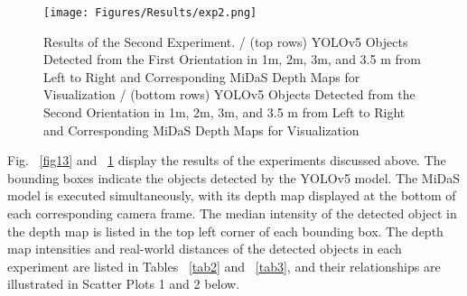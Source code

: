 \begin{figure}[H]
    \centerline{\texttt{[image: Figures/Results/exp2.png]}}
    \caption{Results of the Second Experiment. / (top rows) YOLOv5 Objects Detected from the First Orientation in 1m, 2m, 3m, and 3.5 m from Left to Right and Corresponding MiDaS Depth Maps for Visualization / (bottom rows) YOLOv5 Objects Detected from the Second Orientation in 1m, 2m, 3m, and 3.5 m from Left to Right and Corresponding MiDaS Depth Maps for Visualization}
    \label{fig14}
\end{figure}

Fig. ~\ref{fig13} and ~\ref{fig14} display the results of the experiments discussed above. The bounding boxes indicate the objects detected by the YOLOv5 model. The MiDaS model is executed simultaneously, with its depth map displayed at the bottom of each corresponding camera frame. The median intensity of the detected object in the depth map is listed in the top left corner of each bounding box. The depth map intensities and real-world distances of the detected objects in each experiment are listed in Tables ~\ref{tab2} and ~\ref{tab3}, and their relationships are illustrated in Scatter Plots 1 and 2 below.

\begin{table}[H]
    \caption{Data from Experiment 1}
    \begin{center}
        \label{tab2}
    \end{center}
\end{table}

\datatable


